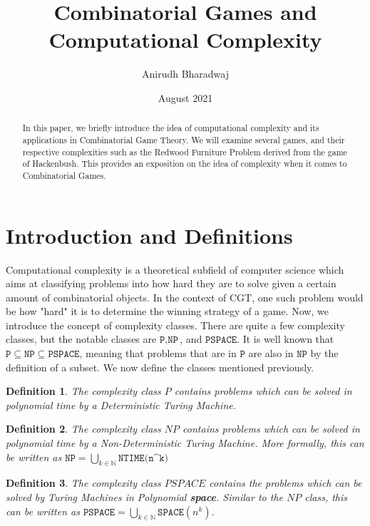 \documentclass{article}
\title{Combinatorial Games and Computational Complexity}
\author{Anirudh Bharadwaj }
\date{August 2021}
\newtheorem{definition}{Definition}
\begin{document}
\maketitle
\begin{abstract}
    In this paper, we briefly introduce the idea of computational complexity and its applications in Combinatorial Game Theory. We will examine several games, and their respective complexities such as the Redwood Furniture Problem derived from the game of Hackenbush. This provides an exposition on the idea of complexity when it comes to Combinatorial Games. 
\end{abstract}

\section{Introduction and Definitions}
Computational complexity is a theoretical subfield of computer science which aims at classifying problems into how hard they are to solve given a certain amount of combinatorial objects. In the context of CGT, one such problem would be how "hard" it is to determine the winning strategy of a game. 
\newline
\newline
Now, we introduce the concept of complexity classes. There are quite a few complexity classes, but the notable classes are $\texttt{P}, \texttt{NP}$, and $\texttt{PSPACE}$. It is well known that $\texttt{P} \subseteq \texttt{NP} \subseteq \texttt{PSPACE}$, meaning that problems that are in $\texttt{P}$ are also in $\texttt{NP}$ by the definition of a subset. We now define the classes mentioned previously.
\begin{definition}
The complexity class $P$ contains problems which can be solved in polynomial time by a Deterministic Turing Machine.  
\end{definition}
\begin{definition}
The complexity class $NP$ contains problems which can be solved in polynomial time by a Non-Deterministic Turing Machine. More formally, this can be written as $\texttt{NP} = \bigcup_{k \in \mathbb{N}}{\texttt{NTIME(n^k)}}$
\end{definition}

\begin{definition}
The complexity class $PSPACE$ contains the problems which can be solved by Turing Machines in Polynomial \textbf{space}. Similar to the $NP$ class, this can be written as $\texttt{PSPACE} = \bigcup_{k \in \mathbb{N}}{\texttt{SPACE}(n^k)}$.
\end{definition}
\end{document}
